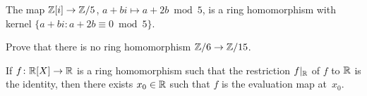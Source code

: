 \begin{example}
The map $\mathbb{Z}[i]\to\mathbb{Z}/5$, $a+bi\mapsto a+2b\bmod 5$, is a ring homomorphism 
with kernel $\{a+bi:a+2b\equiv 0\bmod 5\}$. 	
\end{example}

\begin{exercise}
\label{xca:Z6->Z15}
Prove that there is no ring homomorphism $\mathbb{Z}/6\to\mathbb{Z}/15$. 
\end{exercise}

\begin{exercise}
\label{xca:evaluation_map}
If $f\colon\mathbb{R}[X]\to\mathbb{R}$ is a ring homomorphism 
such that the restriction $f|_{\mathbb{R}}$ of 
$f$ to $\mathbb{R}$ is the identity, then there exists $x_0\in\mathbb{R}$ such that 
$f$ is the evaluation map at~$x_0$. 
\end{exercise}

